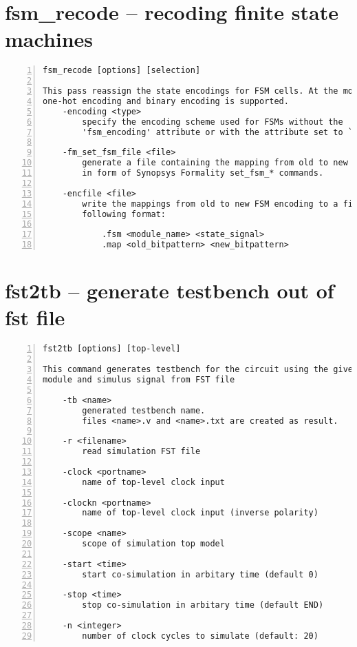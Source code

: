 \section{fsm\_recode -- recoding finite state machines}
\label{cmd:fsm_recode}
\begin{lstlisting}[numbers=left,frame=single]
    fsm_recode [options] [selection]

This pass reassign the state encodings for FSM cells. At the moment only
one-hot encoding and binary encoding is supported.
    -encoding <type>
        specify the encoding scheme used for FSMs without the
        'fsm_encoding' attribute or with the attribute set to `auto'.

    -fm_set_fsm_file <file>
        generate a file containing the mapping from old to new FSM encoding
        in form of Synopsys Formality set_fsm_* commands.

    -encfile <file>
        write the mappings from old to new FSM encoding to a file in the
        following format:

            .fsm <module_name> <state_signal>
            .map <old_bitpattern> <new_bitpattern>
\end{lstlisting}

\section{fst2tb -- generate testbench out of fst file}
\label{cmd:fst2tb}
\begin{lstlisting}[numbers=left,frame=single]
    fst2tb [options] [top-level]

This command generates testbench for the circuit using the given top-level
module and simulus signal from FST file

    -tb <name>
        generated testbench name.
        files <name>.v and <name>.txt are created as result.

    -r <filename>
        read simulation FST file

    -clock <portname>
        name of top-level clock input

    -clockn <portname>
        name of top-level clock input (inverse polarity)

    -scope <name>
        scope of simulation top model

    -start <time>
        start co-simulation in arbitary time (default 0)

    -stop <time>
        stop co-simulation in arbitary time (default END)

    -n <integer>
        number of clock cycles to simulate (default: 20)
\end{lstlisting}

